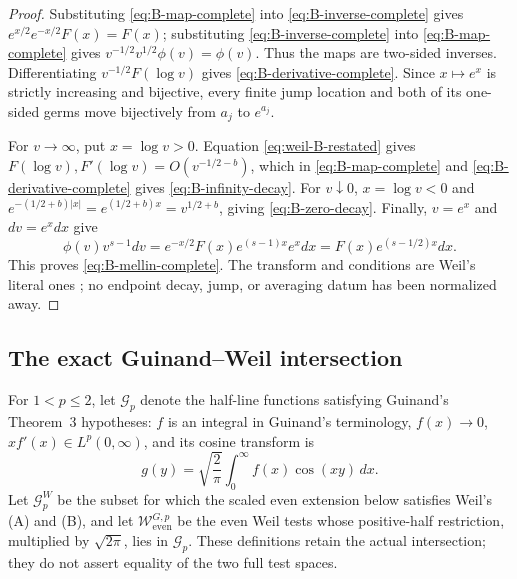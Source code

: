 \begin{proof}
Substituting \eqref{eq:B-map-complete} into
\eqref{eq:B-inverse-complete} gives
$e^{x/2}e^{-x/2}F(x)=F(x)$; substituting
\eqref{eq:B-inverse-complete} into \eqref{eq:B-map-complete} gives
$v^{-1/2}v^{1/2}\phi(v)=\phi(v)$.  Thus the maps are two-sided inverses.
Differentiating $v^{-1/2}F(\log v)$ gives
\eqref{eq:B-derivative-complete}.  Since $x\mapsto e^x$ is strictly
increasing and bijective, every finite jump location and both of its one-sided
germs move bijectively from $a_j$ to $e^{a_j}$.

For $v\to\infty$, put $x=\log v>0$.  Equation
\eqref{eq:weil-B-restated} gives
$F(\log v),F'(\log v)=O(v^{-1/2-b})$, which in
\eqref{eq:B-map-complete} and \eqref{eq:B-derivative-complete} gives
\eqref{eq:B-infinity-decay}.  For $v\downarrow0$, $x=\log v<0$ and
$e^{-(1/2+b)|x|}=e^{(1/2+b)x}=v^{1/2+b}$, giving
\eqref{eq:B-zero-decay}.  Finally, $v=e^x$ and $dv=e^x dx$ give
\[
 \phi(v)v^{s-1}dv
 =e^{-x/2}F(x)e^{(s-1)x}e^x dx
 =F(x)e^{(s-1/2)x}dx.
\]
This proves \eqref{eq:B-mellin-complete}.  The transform and conditions are
Weil's literal ones
\cite[Collected Papers II, pp.~52 and~55--58]{weil1952}; no endpoint decay,
jump, or averaging datum has been normalized away.
\end{proof}

\subsection{The exact Guinand--Weil intersection}

For $1<p\leq2$, let $\mathcal G_p$ denote the half-line functions satisfying
Guinand's Theorem~3 hypotheses: $f$ is an integral in Guinand's terminology,
$f(x)\to0$, $xf'(x)\in L^p(0,\infty)$, and its cosine transform is
\begin{equation}
 g(y)=\sqrt{\frac2\pi}\int_0^\infty f(x)\cos(xy)\,dx.
 \label{eq:guinand-transform-B}
\end{equation}
Let $\mathcal G_p^W$ be the subset for which the scaled even extension below
satisfies Weil's (A) and (B), and let $\mathcal W_{\mathrm{even}}^{G,p}$ be the
even Weil tests whose positive-half restriction, multiplied by
$\sqrt{2\pi}$, lies in $\mathcal G_p$.  These definitions retain the actual
intersection; they do not assert equality of the two full test spaces.

